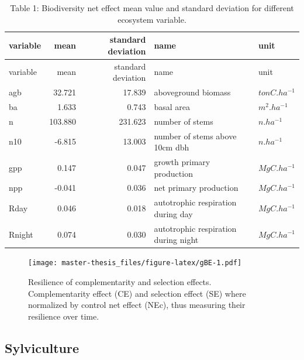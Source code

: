 \documentclass[12pt,]{article}
\theoremstyle{definition}
\theoremstyle{definition}
\theoremstyle{remark}
\begin{document}
\begin{longtable}[]{@{}lrrll@{}}
\caption{\label{tab:tNE}Table 1: Biodiversity net effect mean value and
standard deviation for different ecosystem variable.}\tabularnewline
\toprule
variable & mean & standard deviation & name & unit\tabularnewline
\midrule
\endfirsthead
\toprule
variable & mean & standard deviation & name & unit\tabularnewline
\midrule
\endhead
agb & 32.721 & 17.839 & aboveground biomass &
\(tonC.ha^{-1}\)\tabularnewline
ba & 1.633 & 0.743 & basal area & \(m^2.ha^{-1}\)\tabularnewline
n & 103.880 & 231.623 & number of stems & \(n.ha^{-1}\)\tabularnewline
n10 & -6.815 & 13.003 & number of stems above 10cm dbh &
\(n.ha^{-1}\)\tabularnewline
gpp & 0.147 & 0.047 & growth primary production &
\(MgC.ha^{-1}\)\tabularnewline
npp & -0.041 & 0.036 & net primary production &
\(MgC.ha^{-1}\)\tabularnewline
Rday & 0.046 & 0.018 & autotrophic respiration during day &
\(MgC.ha^{-1}\)\tabularnewline
Rnight & 0.074 & 0.030 & autotrophic respiration during night &
\(MgC.ha^{-1}\)\tabularnewline
\bottomrule
\end{longtable}

\begin{figure}[htbp]
\centering
\texttt{[image: master-thesis\_files/figure-latex/gBE-1.pdf]}
\caption{\label{fig:gBE}Resilience of complementarity and selection effects.
Complementarity effect (CE) and selection effect (SE) where normalized
by control net effect (NEc), thus measuring their resilience over time.}
\end{figure}

\subsection{Sylviculture}\label{sylviculture-1}
\end{document}
